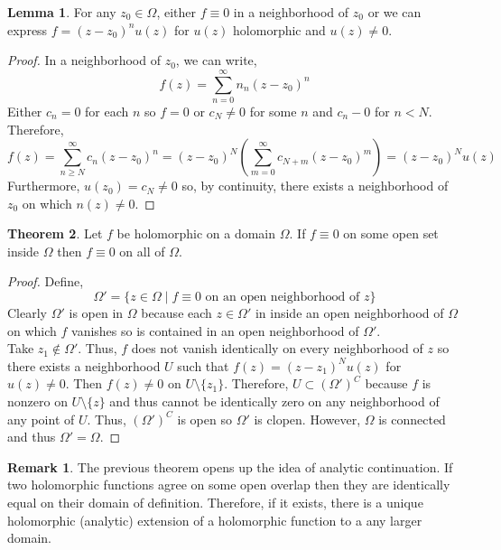 \documentclass[12pt]{extarticle}
\theoremstyle{definition}
\newtheorem{theorem}{Theorem}[section]
\newtheorem{lemma}[theorem]{Lemma}
\newtheorem{remark}{Remark}
\begin{document}
\begin{lemma}
For any $z_0 \in \Omega$, either $f \equiv 0$ in a neighborhood of $z_0$ or we can express $f = (z - z_0)^n u(z)$ for $u(z)$ holomorphic and $u(z) \neq 0$.
\end{lemma}



\begin{proof}
In a neighborhood of $z_0$, we can write,
\[ f(z) = \sum_{n = 0}^\infty n_n(z - z_0)^n\]
Either $c_n = 0$ for each $n$ so $f = 0$ or $c_N \neq 0$ for some $n$ and $c_n - 0$ for $n < N$. Therefore,
\[ f(z) = \sum_{n \ge N}^\infty c_n(z - z_0)^n = (z - z_0)^N \left( \sum_{m = 0}^\infty c_{N + m} (z - z_0)^m \right) = (z - z_0)^N u(z) \]
Furthermore, $u(z_0) = c_N \neq 0$ so, by continuity, there exists a neighborhood of $z_0$ on which $n(z) \neq 0$.  
\end{proof}


\begin{theorem}
Let $f$ be holomorphic on a domain $\Omega$. If $f \equiv 0$ on some open set inside $\Omega$ then $f \equiv 0$ on all of $\Omega$. 
\end{theorem}

\begin{proof}
Define,
\[ \Omega' = \{ z \in \Omega \mid f \equiv 0 \text{ on an open neighborhood of } z \} \]
Clearly $\Omega'$ is open in $\Omega$ because each $z \in \Omega'$ in inside an open neighborhood of $\Omega$ on which $f$ vanishes so is contained in an open neighborhood of $\Omega'$.
\\
Take $z_1 \notin \Omega'$. Thus, $f$ does not vanish identically on every neighborhood of $z$ so there exists a neighborhood $U$ such that $f(z) = (z - z_1)^N u(z)$ for $u(z) \neq 0$. Then $f(z) \neq 0$ on $U \setminus \{z_1\}$. Therefore, $U \subset (\Omega')^C$ because $f$ is nonzero on $U \setminus \{z\}$ and thus cannot be identically zero on any neighborhood of any point of $U$. Thus, $(\Omega')^C$ is open so $\Omega'$ is clopen. However, $\Omega$ is connected and thus $\Omega' = \Omega$.  
\end{proof}


\begin{remark}
The previous theorem opens up the idea of analytic continuation. If two holomorphic functions agree on some open overlap then they are identically equal on their domain of definition. Therefore, if it exists, there is a unique holomorphic (analytic) extension of a holomorphic function to a any larger domain. 
\end{remark}
\end{document}
